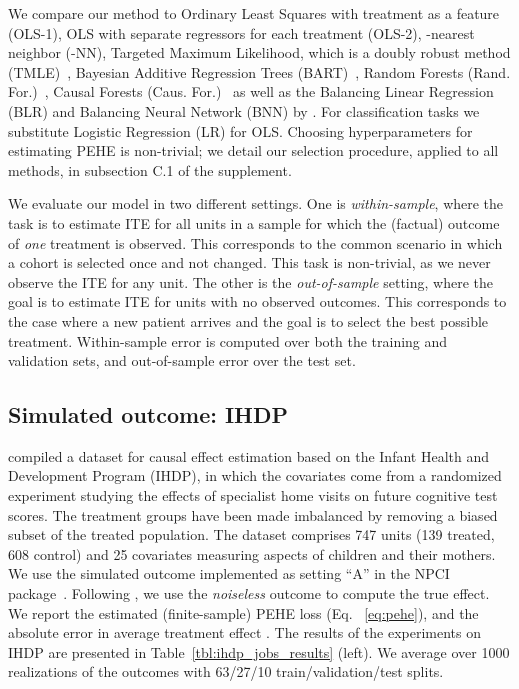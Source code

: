\documentclass{article}
\begin{document}
We compare our method to Ordinary Least Squares with treatment as a feature (OLS-1), OLS with separate regressors for each treatment (OLS-2), -nearest neighbor (-NN), Targeted Maximum Likelihood, which is a doubly robust method (TMLE)~\citep{gruber2011tmle}, Bayesian Additive Regression Trees (BART)~\citep{chipman2010bart,bayestree}, Random Forests (Rand. For.)~\citep{breiman2001random}, Causal Forests  (Caus. For.)~\citep{wager2015estimation} as well as the Balancing Linear Regression (BLR) and Balancing Neural Network (BNN) by \citet{johansson2016counterfactual}.
For classification tasks we substitute Logistic Regression (LR) for OLS.  Choosing hyperparameters for estimating PEHE is non-trivial; we detail our selection procedure, applied to all methods, in subsection C.1 of the supplement.



We evaluate our model in two different settings. One is \emph{within-sample}, where the task is to estimate ITE for all units in a sample for which the (factual) outcome of \emph{one} treatment is observed. This corresponds to the common scenario in which a cohort is selected once and not changed. This task is non-trivial, as we never observe the ITE for any unit. The other is the \emph{out-of-sample} setting, where the goal is to estimate ITE for units with no observed outcomes. This corresponds to the case where a new patient arrives and the goal is to select the best possible treatment. Within-sample error is computed over both the training and validation sets, and out-of-sample error over the test set.

\vskip -7pt
\subsection{Simulated outcome: IHDP}\vskip -5pt
\citet{hill2011bayesian} compiled a dataset for causal effect estimation based on the Infant Health and Development Program (IHDP), in which the covariates come from a randomized experiment studying the effects of specialist home visits on future cognitive test scores. The treatment groups have been made imbalanced by removing a biased subset of the treated population. The dataset comprises 747 units (139 treated, 608 control) and 25 covariates measuring aspects of children and their mothers. We use the simulated outcome implemented as setting ``A'' in the NPCI package~\citep{npci}. Following \citet{hill2011bayesian}, we use the \emph{noiseless} outcome to compute the true effect. We report the estimated (finite-sample) PEHE loss  (Eq. ~\ref{eq:pehe}), and the absolute error in average treatment effect .
The results of the experiments on IHDP are presented in Table~\ref{tbl:ihdp_jobs_results} (left). We average over 1000 realizations of the outcomes with 63/27/10 train/validation/test splits.
\end{document}
